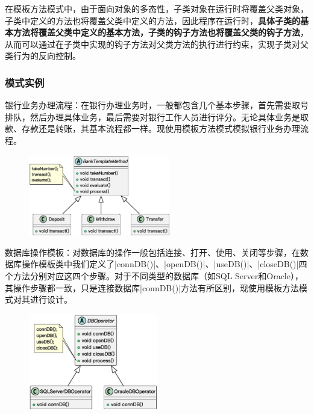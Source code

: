 在模板方法模式中，由于面向对象的多态性，子类对象在运行时将覆盖父类对象，子类中定义的方法也将覆盖父类中定义的方法，因此程序在运行时，\textbf{具体子类的基本方法将覆盖父类中定义的基本方法，子类的钩子方法也将覆盖父类的钩子方法}，从而可以通过在子类中实现的钩子方法对父类方法的执行进行约束，实现子类对父类行为的反向控制。

\subsubsection{模式实例}
银行业务办理流程：在银行办理业务时，一般都包含几个基本步骤，首先需要取号排队，然后办理具体业务，最后需要对银行工作人员进行评分。无论具体业务是取款、存款还是转账，其基本流程都一样。现使用模板方法模式模拟银行业务办理流程。
\begin{figure}[H]
    \vspace{-0.5em}
	\centering
	\includegraphics[width=0.55\textwidth]{images/模板方法模式实例1.eps}
    \vspace{-1em}
\end{figure}


数据库操作模板：对数据库的操作一般包括连接、打开、使用、关闭等步骤，在数据库操作模板类中我们定义了\sverb|connDB()|、\sverb|openDB()|、\sverb|useDB()|、\sverb|closeDB()|\;四个方法分别对应这四个步骤。对于不同类型的数据库（如SQL Server和Oracle），其操作步骤都一致，只是连接数据库\sverb|connDB()|\;方法有所区别，现使用模板方法模式对其进行设计。
\begin{figure}[H]
    \vspace{-0.5em}
	\centering
	\includegraphics[width=0.5\textwidth]{images/模板方法模式实例2.eps}
    \vspace{-1em}
\end{figure}

